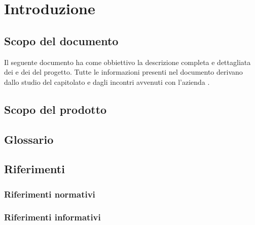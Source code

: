 \section{Introduzione}
\subsection{Scopo del documento}
Il seguente documento ha come obbiettivo la descrizione completa e dettagliata dei  e dei   del progetto. Tutte le informazioni presenti nel documento derivano dallo studio del capitolato e dagli incontri avvenuti con l'azienda .
\subsection{Scopo del prodotto}
\subsection{Glossario}
\subsection{Riferimenti}
\subsubsection{Riferimenti normativi}
\subsubsection{Riferimenti informativi}